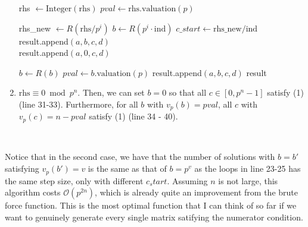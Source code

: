 \documentclass[letterpaper,12pt]{article}
\newcommand{\bigO}{\mathcal{O}}
\begin{document}
\begin{enumerate}
\begin{algorithm}
\begin{algorithmic}[1]
            \State rhs $\gets \text{Integer}(\text{rhs})$
            \State $pval \gets \text{rhs.valuation}(p)$

                \State rhs\_new $\gets R(\text{rhs} / p^i)$
                    \State $b \gets R(p^i \cdot \text{ind})$
                        \State $c\_start \gets \text{rhs\_new} / \text{ind}$
                            \State result.append$(a, b, c, d)$
                        \EndFor
                    \EndIf
                \EndFor
            \EndFor \\

        \Else
                \State result.append$(a, 0, c, d)$
            \EndFor

                \State $b \gets R(b)$
                \State $pval \gets b.\text{valuation}(p)$
                    \State result.append$(a, b, c, d)$
                \EndFor
            \EndFor
        \EndIf
    \EndFor
    \State \Return result
\EndFunction
\end{algorithmic}
\end{algorithm}

\item $\text{rhs} \equiv 0 \bmod p^n$.
Then, we can set $b=0$ so that all $c \in [0, p^n-1]$ satisfy (1) (line 31-33).
Furthermore, for all $b$ with $v_p(b) = pval$, 
all $c$ with $v_p(c) = n-pval$ satisfy (1) (line 34 - 40). 

\end{enumerate}

\

Notice that in the second case, we have that the number of solutions 
with $b = b'$ satisfying $v_p(b') = v$ is the same as that of $b = p^v$
as the loops in line 23-25 has the same step size, only with different $c_start$.
Assuming $n$ is not large, this algorithm costs $\bigO(p^{2n})$,
which is already quite an improvement from the brute force function.
This is the most optimal function that I can think of so far if we want to genuinely
generate every single matrix satifying the numerator condition.

\
\end{document}
